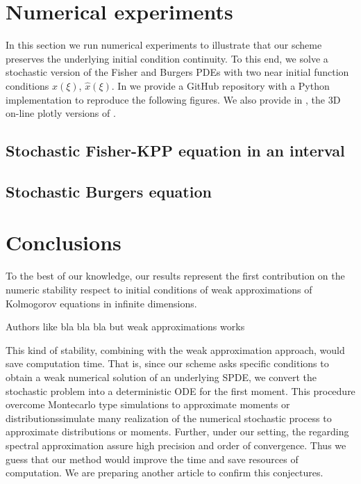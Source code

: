 \documentclass[review,onefignum,onetabnum]{siamart190516}
\begin{document}
\section{Numerical experiments}
    \label{sec:NumericalExperiments}
        In this section we run numerical experiments to illustrate that our
    scheme preserves the underlying initial condition continuity. To 
    this end, we solve  a stochastic version of the  Fisher and Burgers PDEs 
    with two near initial function conditions $x(\xi)$, 
    $\widehat{x}(\xi)$. In \cite{matsumyaRepo} we provide a GitHub repository 
    with a Python implementation to reproduce the following figures. We also 
    provide in \cite{plotlyFisher, plotlyBurgers}, the 3D on-line plotly 
    versions of .
%
    \subsection*{Stochastic Fisher-KPP equation in an interval}
        
    \subsection*{Stochastic Burgers equation}
        

\section{Conclusions}
        To the best of our knowledge, our results represent the first 
    contribution on the numeric stability respect to initial conditions of weak 
    approximations of Kolmogorov equations in infinite dimensions. 
    
    Authors like bla bla bla but weak approximations works
    
    This kind of stability, combining with the weak approximation approach, 
    would save computation time. That is, since our scheme asks specific 
    conditions to obtain a weak numerical solution of an underlying SPDE, we 
    convert the stochastic problem into a deterministic ODE for the first 
    moment. This procedure overcome Montecarlo type simulations to  approximate 
    moments or   distributions\textemdash simulate many realization of the 
    numerical stochastic process to approximate distributions or moments. 
    Further, under  our setting, the regarding spectral approximation assure 
    high precision and order of convergence. Thus we guess 
    that our method would improve the time and save resources of
    computation. We are preparing another article to confirm this 
    conjectures.



\end{document}
